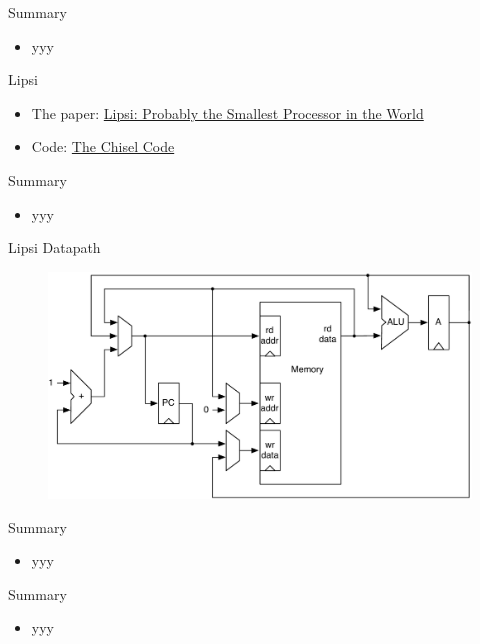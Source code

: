 \begin{frame}[fragile]{Summary}
\begin{itemize}
\item yyy
\end{itemize}
\end{frame}

\begin{frame}[fragile]{Lipsi}
\begin{itemize}
\item The paper: \href{https://www.jopdesign.com/doc/lipsi.pdf}{Lipsi: Probably the Smallest Processor in the World}
\item Code: \href{https://github.com/schoeberl/lipsi}{The Chisel Code}
\end{itemize}
\end{frame}

\begin{frame}[fragile]{Summary}
\begin{itemize}
\item yyy
\end{itemize}
\end{frame}


\begin{frame}[fragile]{Lipsi Datapath}
\begin{figure}
  \includegraphics[scale=0.5]{../figures/lipsi}
\end{figure}
\end{frame}

\begin{frame}[fragile]{Summary}
\begin{itemize}
\item yyy
\end{itemize}
\end{frame}

\begin{frame}[fragile]{Summary}
\begin{itemize}
\item yyy
\end{itemize}
\end{frame}

